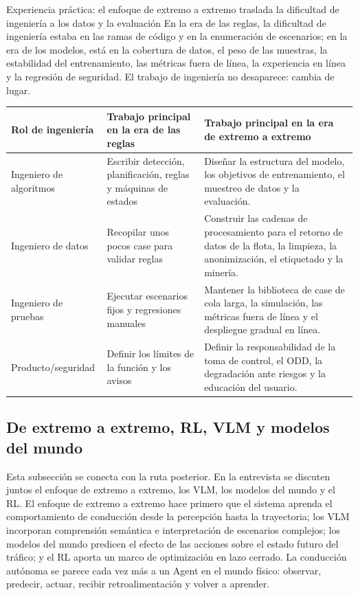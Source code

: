 \documentclass[a4paper]{article}
\begin{document}
\begin{knowledgebox}{Experiencia práctica: el enfoque de extremo a extremo traslada la dificultad de ingeniería a los datos y la evaluación}
En la era de las reglas, la dificultad de ingeniería estaba en las ramas de código y en la enumeración de escenarios; en la era de los modelos, está en la cobertura de datos, el peso de las muestras, la estabilidad del entrenamiento, las métricas fuera de línea, la experiencia en línea y la regresión de seguridad. El trabajo de ingeniería no desaparece: cambia de lugar.
\end{knowledgebox}

\noindent\begin{tabularx}{\textwidth}{p{}p{}X}
\toprule
Rol de ingeniería & Trabajo principal en la era de las reglas & Trabajo principal en la era de extremo a extremo \\
\midrule
Ingeniero de algoritmos & Escribir detección, planificación, reglas y máquinas de estados & Diseñar la estructura del modelo, los objetivos de entrenamiento, el muestreo de datos y la evaluación. \\
Ingeniero de datos & Recopilar unos pocos case para validar reglas & Construir las cadenas de procesamiento para el retorno de datos de la flota, la limpieza, la anonimización, el etiquetado y la minería. \\
Ingeniero de pruebas & Ejecutar escenarios fijos y regresiones manuales & Mantener la biblioteca de case de cola larga, la simulación, las métricas fuera de línea y el despliegue gradual en línea. \\
Producto/seguridad & Definir los límites de la función y los avisos & Definir la responsabilidad de la toma de control, el ODD, la degradación ante riesgos y la educación del usuario. \\
\bottomrule
\end{tabularx}

\subsection{De extremo a extremo, RL, VLM y modelos del mundo}

Esta subsección se conecta con la ruta posterior. En la entrevista se discuten juntos el enfoque de extremo a extremo, los VLM, los modelos del mundo y el RL. El enfoque de extremo a extremo hace primero que el sistema aprenda el comportamiento de conducción desde la percepción hasta la trayectoria; los VLM incorporan comprensión semántica e interpretación de escenarios complejos; los modelos del mundo predicen el efecto de las acciones sobre el estado futuro del tráfico; y el RL aporta un marco de optimización en lazo cerrado. La conducción autónoma se parece cada vez más a un Agent en el mundo físico: observar, predecir, actuar, recibir retroalimentación y volver a aprender.
\end{document}
